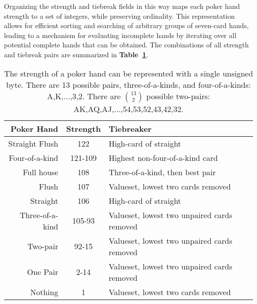 Organizing the strength and tiebreak fields in this way maps each poker hand strength to a set of integers, while preserving ordinality.
This representation allows for efficient sorting and searching of arbitrary groups of seven-card hands, leading to a mechanism for evaluating incomplete hands by iterating over all potential complete hands that can be obtained.
The combinations of all strength and tiebreak pairs are summarized in \textbf{Table~\ref{tab:StrengthByte}}.


\begin{table}[htb]
\captionsetup{position=top}
\caption[Hand Strength Byte]{The strength of a poker hand can be represented with a single unsigned byte.
There are 13 possible pairs, three-of-a-kinds, and four-of-a-kinds: A,K,...,3,2.
There are $\binom{13}{2}$ possible two-pairs: AK,AQ,AJ,...,54,53,52,43,42,32.}
\begin{small}
\begin{center}
\begin{tabular}{|r|c|l|}
\hline
Poker Hand      & Strength & Tiebreaker                                   \\ \hline
Straight Flush  & 122      & High-card of straight                        \\%
Four-of-a-kind  & 121-109  & Highest non-four-of-a-kind card              \\
Full house      & 108      & Three-of-a-kind, then best pair              \\
Flush           & 107      & Valueset, lowest two cards removed           \\
Straight        & 106      & High-card of straight                        \\
Three-of-a-kind & 105-93   & Valueset, lowest two unpaired cards removed  \\
Two-pair        & 92-15    & Valueset, lowest two unpaired cards removed  \\
One Pair        & 2-14     & Valueset, lowest two unpaired cards removed  \\
Nothing         & 1        & Valueset, lowest two cards removed           \\
\hline
\end{tabular}
\label{tab:StrengthByte}
\end{center}
\end{small}
\end{table}


